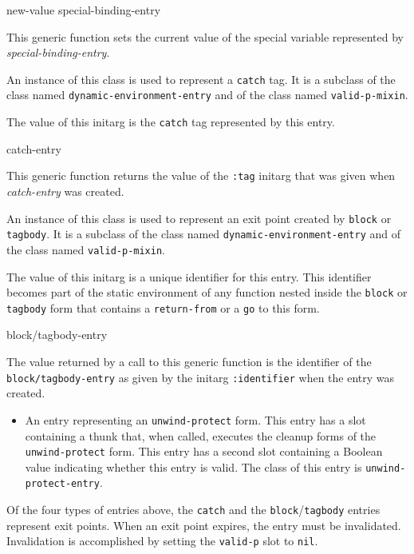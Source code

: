  {new-value special-binding-entry}

This generic function sets the current value of the special
variable represented by \textit{special-binding-entry}.


An instance of this class is used to represent a \texttt{catch} tag.
It is a subclass of the class named \texttt{dynamic-environment-entry}
and of the class named \texttt{valid-p-mixin}.


The value of this initarg is the \texttt{catch} tag represented by
this entry.

 {catch-entry}

This generic function returns the value of the \texttt{:tag} initarg
that was given when \textit{catch-entry} was created.


An instance of this class is used to represent an exit point created
by \texttt{block} or \texttt{tagbody}.  It is a subclass of the class
named \texttt{dynamic-environment-entry} and of the class named
\texttt{valid-p-mixin}.


The value of this initarg is a unique identifier for this entry.  This
identifier becomes part of the static environment of any function
nested inside the \texttt{block} or \texttt{tagbody} form that
contains a \texttt{return-from} or a \texttt{go} to this form.

 {block/tagbody-entry}

The value returned by a call to this generic function is the
identifier of the \texttt{block/tagbody-entry} as given by the initarg
\texttt{:identifier} when the entry was created.

\begin{itemize}

  \item An entry representing an \texttt{unwind-protect} form.  This
    entry has a slot containing a thunk that, when called, executes
    the cleanup forms of the \texttt{unwind-protect} form.
    This entry has a second slot containing a Boolean value
    indicating whether this entry is valid.  The class of this entry
    is \texttt{unwind-protect-entry}.
\end{itemize}

Of the four types of entries above, the \texttt{catch} and the
\texttt{block}/\texttt{tagbody} entries represent exit points.  When
an exit point expires, the entry must be invalidated.  Invalidation is
accomplished by setting the \texttt{valid-p} slot to \texttt{nil}.

